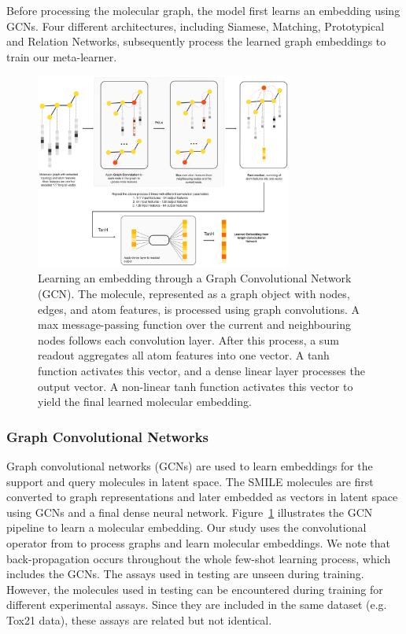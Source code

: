 Before processing the molecular graph, the model first learns an embedding using GCNs. Four different architectures, including Siamese, Matching, Prototypical and Relation Networks, subsequently process the learned graph embeddings to train our meta-learner.

\begin{figure}[ht!]
    \centering
    \includegraphics[width=0.75\textwidth]{img/DVGCNArchi.png}
    \caption{Learning an embedding through a Graph Convolutional Network (GCN). The molecule, represented as a graph object with nodes, edges, and atom features, is processed using graph convolutions. A max message-passing function over the current and neighbouring nodes follows each convolution layer. After this process, a sum readout aggregates all atom features into one vector. A tanh function activates this vector, and a dense linear layer processes the output vector. A non-linear tanh function activates this vector to yield the final learned molecular embedding.}
    \label{fig:dvgcnarchi}
\end{figure}

\subsubsection{Graph Convolutional Networks}

Graph convolutional networks (GCNs) are used to learn embeddings for the support and query molecules in latent space. The SMILE molecules are first converted to graph representations and later embedded as vectors in latent space using GCNs and a final dense neural network. Figure~\ref{fig:dvgcnarchi} illustrates the GCN pipeline to learn a molecular embedding. Our study uses the convolutional operator from \citet{kipf2016semi} to process graphs and learn molecular embeddings. We note that back-propagation occurs throughout the whole few-shot learning process, which includes the GCNs. The assays used in testing are unseen during training. However, the molecules used in testing can be encountered during training for different experimental assays. Since they are included in the same dataset (e.g. Tox21 data), these assays are related but not identical.

